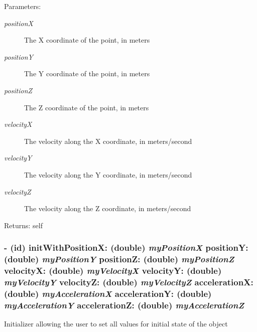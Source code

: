 \begin{Desc}
\item[Parameters:]
\begin{description}
\item[{\em positionX}]The X coordinate of the point, in meters \item[{\em positionY}]The Y coordinate of the point, in meters \item[{\em positionZ}]The Z coordinate of the point, in meters \item[{\em velocityX}]The velocity along the X coordinate, in meters/second \item[{\em velocityY}]The velocity along the Y coordinate, in meters/second \item[{\em velocityZ}]The velocity along the Z coordinate, in meters/second\end{description}
\end{Desc}
\begin{Desc}
\item[Returns:]self \end{Desc}
\hypertarget{interface_i_m_s_r_point_object_fd0ee01d2e6b9446c31b836b3acface1}{
\subsubsection[{initWithPositionX:positionY:positionZ:velocityX:velocityY:velocityZ:accelerationX:accelerationY:accelerationZ:}]{\setlength{\rightskip}{0pt plus 5cm}- (id) initWithPositionX: (double) {\em myPositionX}\/ positionY: (double) {\em myPositionY}\/ positionZ: (double) {\em myPositionZ}\/ velocityX: (double) {\em myVelocityX}\/ velocityY: (double) {\em myVelocityY}\/ velocityZ: (double) {\em myVelocityZ}\/ accelerationX: (double) {\em myAccelerationX}\/ accelerationY: (double) {\em myAccelerationY}\/ accelerationZ: (double) {\em myAccelerationZ}}}
\label{interface_i_m_s_r_point_object_fd0ee01d2e6b9446c31b836b3acface1}


Initializer allowing the user to set all values for initial state of the object

